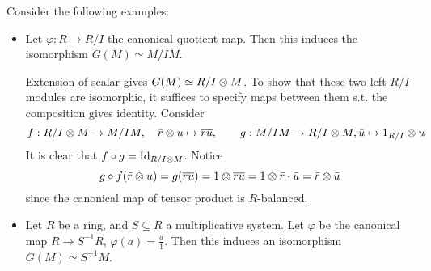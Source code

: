 \documentclass{article}
\begin{document}
\begin{example}
    Consider the following examples:
    \begin{itemize}
        \item Let $\varphi: R \to R/I$ the canonical quotient map. Then this induces the isomorphism $G(M) \simeq M/IM$.
        
        Extension of scalar gives $G(M) \simeq R/I \otimes M$. To show that these two left $R/I$-modules are isomorphic, it suffices to specify maps between them s.t. the composition gives identity. Consider
        \[
            f: R/I \otimes M \to M/IM, \quad \bar{r} \otimes u \mapsto \overline{ru}, \qquad g: M/IM \to R/I \otimes M, \bar{u} \mapsto 1_{R/I} \otimes u
        \]
        It is clear that $f \circ g = \mathrm{Id}_{R/I \otimes M}$. Notice
        \[
            g \circ f (\bar{r} \otimes u) = g(\overline{ru}) = 1 \otimes \overline{ru} = 1 \otimes \bar{r} \cdot \bar{u} = \bar{r} \otimes \bar{u}
        \]
        since the canonical map of tensor product is $R$-balanced.
        \item Let $R$ be a ring, and $S \subseteq R$ a multiplicative system. Let $\varphi$ be the canonical map $R \to S^{-1}R$, $\varphi(a) = \frac{a}{1}$. Then this induces an isomorphism $G(M) \simeq S^{-1}M$.
        

\end{itemize}
\end{example}
\end{document}
